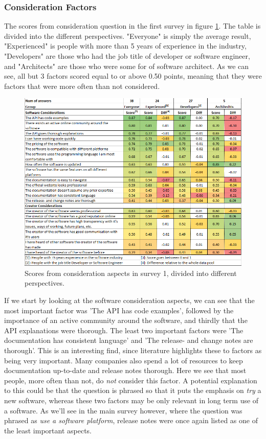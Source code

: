 \documentclass{article}
\begin{document}
\subsubsection{Consideration Factors}
The scores from consideration question in the first survey in figure \ref{fig:scopresByPoints}. The table is divided into the different perspectives. "Everyone" is simply the average result, "Experienced" is people with more than 5 years of experience in the industry, "Developers" are those who had the job title of developer or software engineer, and "Architects" are those who were some for of software architect.
As we can see, all but 3 factors scored equal to or above 0.50 points, meaning that they
were factors that were more often than not considered.
\begin{figure}[H]
\centering
\includegraphics[width=\linewidth]{ScoresByPoints.png}
\caption{Scores from consideration aspects in survey 1, divided into different perspectives.}
\label{fig:scopresByPoints}
\end{figure}
If we start by looking at the software consideration aspects, we can see that the most important
factor was 'The API has code examples', followed by the importance of an
active community around the software, and thirdly that the API
explanations were thorough. The least two important factors were 'The
documentation has consistent language' and 'The release- and change
notes are thorough'.
This is an interesting find, since literature highlights these to factors as being very important. Many companies also spend a lot of resources to keep documentation up-to-date and release notes thorough. Here we see that most people, more often than not, do \textit{not} consider this factor. A potential explanation to this could be that the question is phrased so that it puts the emphasis on \textit{try} a new software, whereas these two factors may be only relevant in long term use of a software. As we'll see in the main survey however, where the question was phrased as \textit{use a software platform}, release notes were once again listed as one of the least important aspects.
\end{document}
